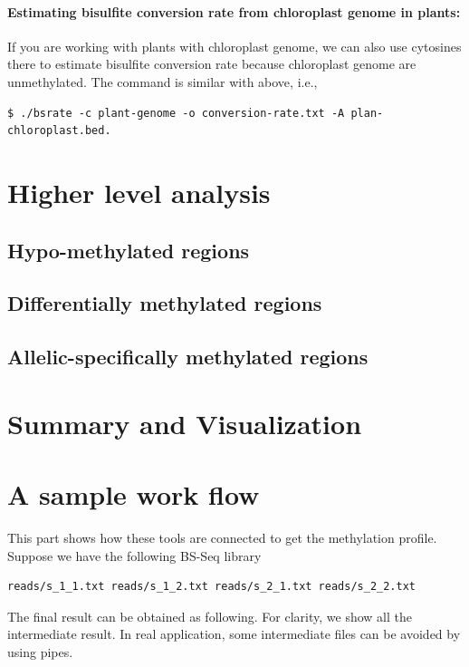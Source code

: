 \documentclass{article}
\begin{document}
\paragraph{Estimating bisulfite conversion rate from chloroplast
  genome in plants:} If you are working with plants with chloroplast
genome, we can also use cytosines there to estimate bisulfite
conversion rate because chloroplast genome are unmethylated. The
command is similar with above, i.e., 
\begin{verbatim}
$ ./bsrate -c plant-genome -o conversion-rate.txt -A plan-chloroplast.bed.  
\end{verbatim}
 
\section{Higher level analysis}
\label{sec:high-level-analys}

\subsection{Hypo-methylated regions}
\label{sec:ident-hypo-methyl}

\subsection{Differentially methylated regions}
\label{sec:ident-diff-methyl}
\subsection{Allelic-specifically methylated regions }
\label{"waiting for reftex-label call..."}


\section{Summary and Visualization}
\label{sec:summary-visualization}

\section{A sample work flow}
This part shows how these tools are connected to get the methylation
profile. Suppose we have the following BS-Seq library
\begin{verbatim}
reads/s_1_1.txt reads/s_1_2.txt reads/s_2_1.txt reads/s_2_2.txt
\end{verbatim}

The final result can be obtained as following. For clarity, we show
all the intermediate result. In real application, some intermediate
files can be avoided by using pipes.
\end{document}
